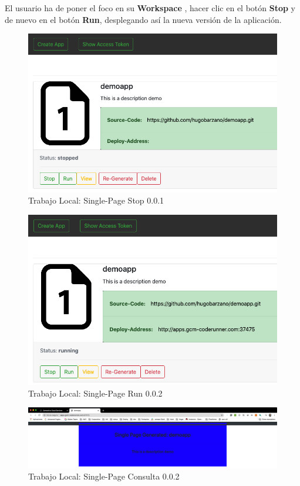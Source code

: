 \documentclass[a4paper,11pt]{book}
\begin{document}
 El usuario ha de poner el foco en su \textbf{Workspace} , hacer clic en el botón \textbf{Stop} y de nuevo en el botón \textbf{Run}, desplegando así la nueva versión de la aplicación. 
 
\begin{figure}[H]
\centering
\includegraphics[scale=0.4]{imagenes/casouso_a/3_9.png}
\caption{ Trabajo Local: Single-Page Stop 0.0.1}
\label{3_9}
\end{figure}
 
\begin{figure}[H]
\centering
\includegraphics[scale=0.4]{imagenes/casouso_a/3_10.png}
\caption{  Trabajo Local: Single-Page Run 0.0.2 }
\label{3_10}
\end{figure}
 
 \begin{figure}[H]
\centering
\includegraphics[scale=0.22]{imagenes/casouso_a/3_11.png}
\caption{   Trabajo Local: Single-Page Consulta 0.0.2}
\label{3_11}
\end{figure}
\end{document}

